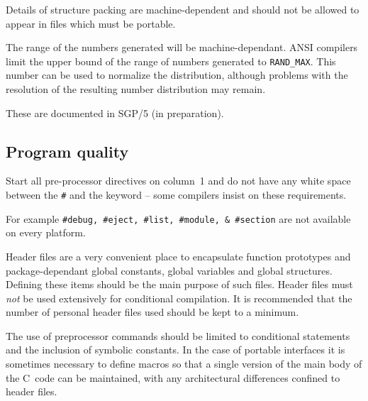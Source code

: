 Details of structure packing are machine-dependent and should not be allowed 
to appear in files which must be portable.



The range of the numbers generated will be machine-dependant.
ANSI compilers limit the upper bound of the range of numbers generated to 
{\tt RAND\_MAX}. 
This number can be used to normalize the distribution, although
problems with the resolution of the resulting number distribution may remain.






These are documented in SGP/5 (in preparation).

\newpage
\subsection{Program quality}



Start all pre-processor directives on column~1 and do not have any white
space between the {\tt \#} and the keyword -- some compilers insist on 
these requirements.


For example \verb~#debug, #eject, #list, #module, & #section~
are not available on every platform.


Header files are a very convenient place to encapsulate function prototypes 
and package-dependant global constants, global variables and global structures.
Defining these items should be the main
purpose of such files. 
Header files must {\sl not\/} be used extensively for conditional
compilation.
It is recommended that the number of personal header files used should 
be kept to a minimum.


The use of preprocessor commands should be limited to conditional 
statements and the inclusion of symbolic constants.
In the case of portable interfaces it is sometimes necessary to define
macros so that a single version of the main body of the C~code can be 
maintained,
with any architectural differences confined to header files.


